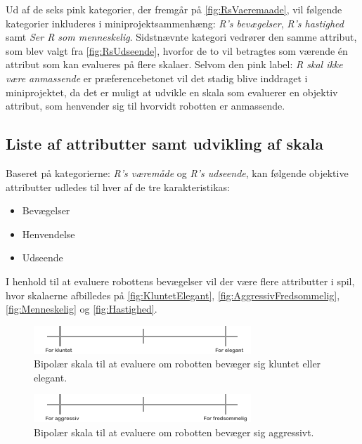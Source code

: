 \noindent
%
Ud af de seks pink kategorier, der fremgår på \autoref{fig:RsVaeremaade}, vil følgende kategorier inkluderes i miniprojektsammenhæng: \textit{R's bevægelser}, \textit{R's hastighed} samt \textit{Ser R som menneskelig}. Sidstnævnte kategori vedrører den samme attribut, som blev valgt fra \autoref{fig:RsUdseende}, hvorfor de to vil betragtes som værende én attribut som kan evalueres på flere skalaer. Selvom den pink label: \textit{R skal ikke være anmassende} er præferencebetonet vil det stadig blive inddraget i miniprojektet, da det er muligt at udvikle en skala som evaluerer en objektiv attribut, som henvender sig til hvorvidt robotten er anmassende.  

\subsection*{Liste af attributter samt udvikling af skala}
\label{ListeAttributterSkala}
%
Baseret på kategorierne: \textit{R's væremåde} og \textit{R's udseende}, kan følgende objektive attributter udledes til hver af de tre karakteristikas: \blankline
%
\begin{itemize}
  \item Bevægelser
  \item Henvendelse
  \item Udseende\blankline
\end{itemize}
%
I henhold til at evaluere robottens bevægelser vil der være flere attributter i spil, hvor skalaerne afbilledes på \autoref{fig:KluntetElegant}, \autoref{fig:AggressivFredsommelig}, \autoref{fig:Menneskelig} og \autoref{fig:Hastighed}.
%
\begin{figure}[H]
\centering
\includegraphics[width =\textwidth]{Figure/KluntetElegant} 
\caption{Bipolær skala til at evaluere om robotten bevæger sig kluntet eller elegant.}
\label{fig:KluntetElegant}
\end{figure}
\noindent
%
%
\begin{figure}[H]
\centering
\includegraphics[width =\textwidth]{Figure/AggressivFredsommelig} 
\caption{Bipolær skala til at evaluere om robotten bevæger sig aggressivt.}
\label{fig:AggressivFredsommelig}
\end{figure}
